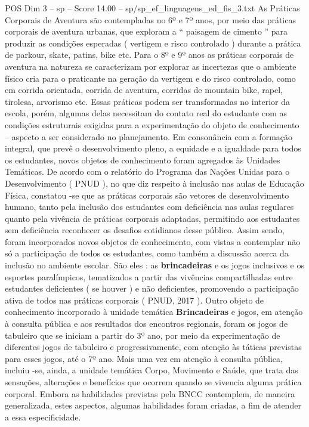 \begin{textsample}{POS Dim 3 – sp – Score 14.00 – sp/sp\_ef\_linguagens\_ed\_fis\_3.txt}
As Práticas Corporais de Aventura são contempladas no 6º e 7º anos, por meio das práticas corporais de aventura urbanas, que exploram a “ paisagem de cimento ” para produzir as condições esperadas ( vertigem e risco controlado ) durante a prática de parkour, skate, patins, bike etc.
Para o 8º e 9º anos as práticas corporais de aventura na natureza se caracterizam por explorar as incertezas que o ambiente físico cria para o praticante na geração da vertigem e do risco controlado, como em corrida orientada, corrida de aventura, corridas de mountain bike, rapel, tirolesa, arvorismo etc.
Essas práticas podem ser transformadas no interior da escola, porém, algumas delas necessitam do contato real do estudante com as condições estruturais exigidas para a experimentação do objeto de conhecimento – aspecto a ser considerado no planejamento.
Em consonância com a formação integral, que prevê o desenvolvimento pleno, a equidade e a igualdade para todos os estudantes, novos objetos de conhecimento foram agregados às Unidades Temáticas.
De acordo com o relatório do Programa das Nações Unidas para o Desenvolvimento ( PNUD ), no que diz respeito à inclusão nas aulas de Educação Física, constatou -se que as práticas corporais são vetores de desenvolvimento humano, tanto pela inclusão dos estudantes com deficiência nas aulas regulares quanto pela vivência de práticas corporais adaptadas, permitindo aos estudantes sem deficiência reconhecer os desafios cotidianos desse público.
Assim sendo, foram incorporados novos objetos de conhecimento, com vistas a contemplar não só a participação de todos os estudantes, como também a discussão acerca da inclusão no ambiente escolar.
São eles : as \textbf{brincadeiras} e os jogos inclusivos e os esportes paralímpicos, tematizados a partir das vivências compartilhadas entre estudantes deficientes ( se houver ) e não deficientes, promovendo a participação ativa de todos nas práticas corporais ( PNUD, 2017 ).
Outro objeto de conhecimento incorporado à unidade temática \textbf{Brincadeiras} e jogos, em atenção à consulta pública e aos resultados dos encontros regionais, foram os jogos de tabuleiro que se iniciam a partir do 3º ano, por meio da experimentação de diferentes jogos de tabuleiro e progressivamente, com atenção às táticas previstas para esses jogos, até o 7º ano.
Mais uma vez em atenção à consulta pública, incluiu -se, ainda, a unidade temática Corpo, Movimento e Saúde, que trata das sensações, alterações e benefícios que ocorrem quando se vivencia alguma prática corporal.
Embora as habilidades previstas pela BNCC contemplem, de maneira generalizada, estes aspectos, algumas habilidades foram criadas, a fim de atender a essa especificidade.

\end{textsample}

